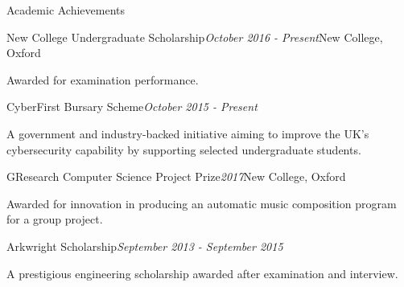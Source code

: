 \documentclass{resume} %
\begin{document}
\begin{rSection}{Academic Achievements} \itemsep -2pt

\begin{rSubsection}{New College Undergraduate Scholarship}{\em October 2016 - Present}{}{New College, Oxford}
	\item Awarded for examination performance.
\end{rSubsection}


\begin{rSubsection}{CyberFirst Bursary Scheme}{\em October 2015 - Present}{}{}
	\item A government and industry-backed initiative aiming to improve the UK's cybersecurity capability by supporting selected undergraduate students.
\end{rSubsection}


\begin{rSubsection}{GResearch Computer Science Project Prize}{\em 2017}{}{New College, Oxford}
	\item Awarded for innovation in producing an automatic music composition program for a group project.
\end{rSubsection}


\begin{rSubsection}{Arkwright Scholarship}{\em September 2013 - September 2015}{}{}
	\item A prestigious engineering scholarship awarded after examination and interview.
\end{rSubsection}

\end{rSection}

\end{document}
